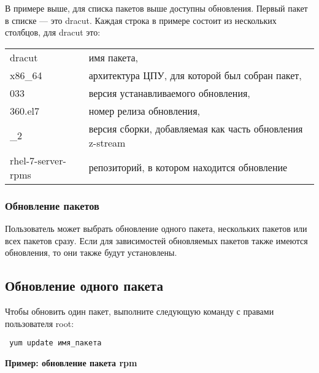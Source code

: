 \documentclass[a4paper,10pt,twoside]{article}
\begin{document}
В примере выше, для списка пакетов выше доступны обновления. Первый пакет в списке — это dracut. Каждая строка в примере состоит из нескольких столбцов, для dracut это:

\begin{longtable}{  m{3cm}  m{10cm}  }  
 dracut & имя пакета,\\
 x86\_64 & архитектура ЦПУ, для которой был собран пакет,\\
 033 & версия устанавливаемого обновления,\\
 360.el7 & номер релиза обновления,\\
 \_2 & версия сборки, добавляемая как часть обновления z-stream\\
 rhel-7-server-rpms & репозиторий, в котором находится обновление\\
\end{longtable}

\subsubsection{Обновление пакетов}
Пользователь может выбрать обновление одного пакета, нескольких пакетов или всех пакетов сразу. Если для зависимостей обновляемых пакетов также имеются обновления, то они также будут установлены.

\subsection{Обновление одного пакета}

Чтобы обновить один пакет, выполните следующую команду с правами пользователя root:
\begin{verbatim}
 yum update имя_пакета
\end{verbatim} 

\textbf{Пример: обновление пакета rpm}
\end{document}
